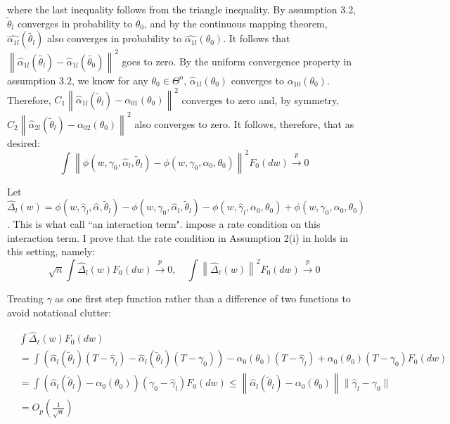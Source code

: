 where the last inequality follows from the triangle inequality. By assumption 3.2, $\tilde{\theta}_l$ converges in probability to $\theta_0$, and by the continuous mapping theorem, $\hat{\alpha_{1l}}(\tilde{\theta_l})$ also converges in probability to $\hat{\alpha_{1l}}(\theta_0)$. It follows that $ \left\| \hat{\alpha}_{1l}(\tilde{\theta_l})-\hat{\alpha}_{1l}(\tilde{\theta_0}) \right \|^2$ goes to zero. By the uniform convergence property in assumption 3.2, we know for any $\theta_0 \in \Theta^\mathrm{o}$, $\hat{\alpha}_{1l}(\theta_0)$ converges to $\alpha_{10}(\theta_0)$. Therefore, $C_1 \left\|\hat{\alpha}_{1l} (\tilde{\theta}_l)-\alpha_{01}(\theta_0 ) \right\|^2$ converges to zero and, by symmetry, $C_2 \left\|\hat{\alpha}_{2l} (\tilde{\theta}_l)-\alpha_{02}(\theta_0 ) \right\|^2$ also converges to zero. It follows, therefore, that as desired:
\[
\int\left\|\phi\left(w, \gamma_0, \hat{\alpha}_{l}, \tilde{\theta}_{l}\right)-\phi\left(w, \gamma_0, \alpha_0, \theta_0\right)\right\|^2 F_0(dw) \xrightarrow{p} 0
\] 


Let  $\hat{\Delta}_l(w)=\phi\left(w, \hat{\gamma}_l, \hat{\alpha}, \tilde{\theta}_l\right)-\phi\left(w, \gamma_0, \hat{\alpha}_l, \tilde{\theta}_l\right)-\phi\left(w, \hat{\gamma}_l, \alpha_0, \theta_0\right)+ \phi\left(w, \gamma_0, \alpha_0, \theta_0\right)$. This is what \citet{chernozhukov2022locally} call ``an interaction term". \citet{chernozhukov2022locally} impose a rate condition on this interaction term. I prove that the rate condition in Assumption 2(i) in \citet{chernozhukov2022locally} holds in this setting, namely:
\[
\sqrt{n} \int \hat{\Delta}_{l}(w) F_0(d w) \xrightarrow{p} 0, \quad \int\left\|\hat{\Delta}_{\ell}(w)\right\|^2 F_0(d w) \xrightarrow{p} 0
\]

Treating $\gamma$ as one first step function rather than a difference of two functions to avoid notational clutter:

\begin{align*}
&\int \hat{\Delta}_{\ell}(w) F_0(dw) \\
&= \int(\hat{\alpha}_l(\tilde{\theta}_l)(T-\hat{\gamma}_l)-\hat{\alpha}_l(\tilde{\theta}_l)(T-\gamma_0))-\alpha_0(\theta_0)(T-\hat{\gamma}_l)+\alpha_0(\theta_0)(T-\gamma_0) F_0(dw) \\
&= \int (\hat{\alpha}_l(\tilde{\theta}_l)-\alpha_0(\theta_0))(\gamma_0-\hat{\gamma}_l) F_0(dw) \leq \left\|\hat{\alpha}_l(\tilde{\theta}_l)-\alpha_0(\theta_0) \right \| \|\hat{\gamma}_l-\gamma_0 \| \\
&= O_p\left(\frac{1}{\sqrt{n}}\right)
\end{align*}


